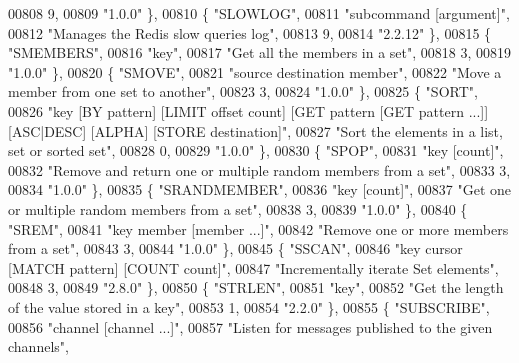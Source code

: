 \begin{DoxyCode}
00808     9,
00809     \textcolor{stringliteral}{"1.0.0"} \},
00810     \{ \textcolor{stringliteral}{"SLOWLOG"},
00811     \textcolor{stringliteral}{"subcommand [argument]"},
00812     \textcolor{stringliteral}{"Manages the Redis slow queries log"},
00813     9,
00814     \textcolor{stringliteral}{"2.2.12"} \},
00815     \{ \textcolor{stringliteral}{"SMEMBERS"},
00816     \textcolor{stringliteral}{"key"},
00817     \textcolor{stringliteral}{"Get all the members in a set"},
00818     3,
00819     \textcolor{stringliteral}{"1.0.0"} \},
00820     \{ \textcolor{stringliteral}{"SMOVE"},
00821     \textcolor{stringliteral}{"source destination member"},
00822     \textcolor{stringliteral}{"Move a member from one set to another"},
00823     3,
00824     \textcolor{stringliteral}{"1.0.0"} \},
00825     \{ \textcolor{stringliteral}{"SORT"},
00826     \textcolor{stringliteral}{"key [BY pattern] [LIMIT offset count] [GET pattern [GET pattern ...]] [ASC|DESC] [ALPHA] [STORE
       destination]"},
00827     \textcolor{stringliteral}{"Sort the elements in a list, set or sorted set"},
00828     0,
00829     \textcolor{stringliteral}{"1.0.0"} \},
00830     \{ \textcolor{stringliteral}{"SPOP"},
00831     \textcolor{stringliteral}{"key [count]"},
00832     \textcolor{stringliteral}{"Remove and return one or multiple random members from a set"},
00833     3,
00834     \textcolor{stringliteral}{"1.0.0"} \},
00835     \{ \textcolor{stringliteral}{"SRANDMEMBER"},
00836     \textcolor{stringliteral}{"key [count]"},
00837     \textcolor{stringliteral}{"Get one or multiple random members from a set"},
00838     3,
00839     \textcolor{stringliteral}{"1.0.0"} \},
00840     \{ \textcolor{stringliteral}{"SREM"},
00841     \textcolor{stringliteral}{"key member [member ...]"},
00842     \textcolor{stringliteral}{"Remove one or more members from a set"},
00843     3,
00844     \textcolor{stringliteral}{"1.0.0"} \},
00845     \{ \textcolor{stringliteral}{"SSCAN"},
00846     \textcolor{stringliteral}{"key cursor [MATCH pattern] [COUNT count]"},
00847     \textcolor{stringliteral}{"Incrementally iterate Set elements"},
00848     3,
00849     \textcolor{stringliteral}{"2.8.0"} \},
00850     \{ \textcolor{stringliteral}{"STRLEN"},
00851     \textcolor{stringliteral}{"key"},
00852     \textcolor{stringliteral}{"Get the length of the value stored in a key"},
00853     1,
00854     \textcolor{stringliteral}{"2.2.0"} \},
00855     \{ \textcolor{stringliteral}{"SUBSCRIBE"},
00856     \textcolor{stringliteral}{"channel [channel ...]"},
00857     \textcolor{stringliteral}{"Listen for messages published to the given channels"},

\end{DoxyCode}
